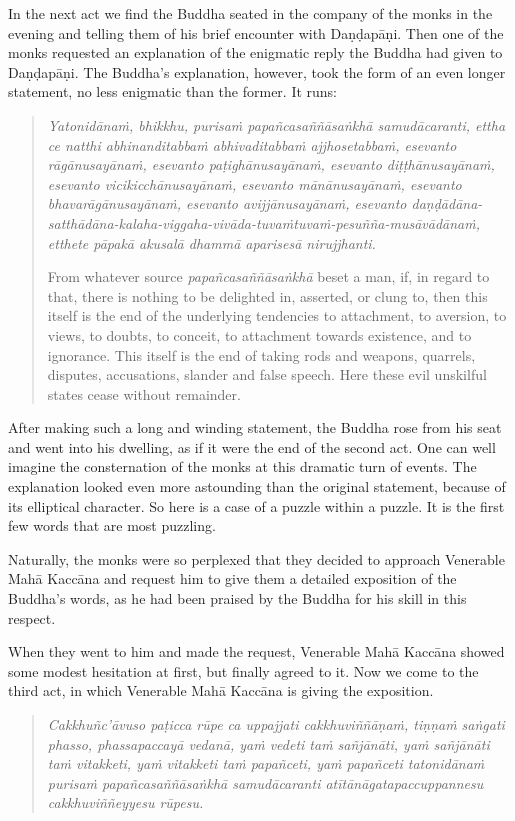 In the next act we find the Buddha seated in the company of the monks in the evening and telling them of his brief encounter with Daṇḍapāṇi. Then one of the monks requested an explanation of the enigmatic reply the Buddha had given to Daṇḍapāṇi. The Buddha's explanation, however, took the form of an even longer statement, no less enigmatic than the former. It runs:

\begin{quote}
\emph{Yatonidānaṁ, bhikkhu, purisaṁ papañcasaññāsaṅkhā samudācaranti, ettha ce natthi abhinanditabbaṁ abhivaditabbaṁ ajjhosetabbaṁ, esevanto rāgānusayānaṁ, esevanto paṭighānusayānaṁ, esevanto diṭṭhānusayānaṁ, esevanto vicikicchānusayānaṁ, esevanto mānānusayānaṁ, esevanto bhavarāgānusayānaṁ, esevanto avijjānusayānaṁ, esevanto daṇḍādāna-satthādāna-kalaha-viggaha-vivāda-tuvaṁtuvaṁ-pesuñña-musāvādānaṁ, etthete pāpakā akusalā dhammā aparisesā nirujjhanti.}

From whatever source \emph{papañcasaññāsaṅkhā} beset a man, if, in regard to that, there is nothing to be delighted in, asserted, or clung to, then this itself is the end of the underlying tendencies to attachment, to aversion, to views, to doubts, to conceit, to attachment towards existence, and to ignorance. This itself is the end of taking rods and weapons, quarrels, disputes, accusations, slander and false speech. Here these evil unskilful states cease without remainder.
\end{quote}

After making such a long and winding statement, the Buddha rose from his seat and went into his dwelling, as if it were the end of the second act. One can well imagine the consternation of the monks at this dramatic turn of events. The explanation looked even more astounding than the original statement, because of its elliptical character. So here is a case of a puzzle within a puzzle. It is the first few words that are most puzzling.

Naturally, the monks were so perplexed that they decided to approach Venerable Mahā Kaccāna and request him to give them a detailed exposition of the Buddha's words, as he had been praised by the Buddha for his skill in this respect.

When they went to him and made the request, Venerable Mahā Kaccāna showed some modest hesitation at first, but finally agreed to it. Now we come to the third act, in which Venerable Mahā Kaccāna is giving the exposition.

\begin{quote}
\emph{Cakkhuñc'āvuso paṭicca rūpe ca uppajjati cakkhuviññāṇaṁ, tiṇṇaṁ saṅgati phasso, phassapaccayā vedanā, yaṁ vedeti taṁ sañjānāti, yaṁ sañjānāti taṁ vitakketi, yaṁ vitakketi taṁ papañceti, yaṁ papañceti tatonidānaṁ purisaṁ papañcasaññāsaṅkhā samudācaranti atītānāgatapaccuppannesu cakkhuviññeyyesu rūpesu.}
\end{quote}

